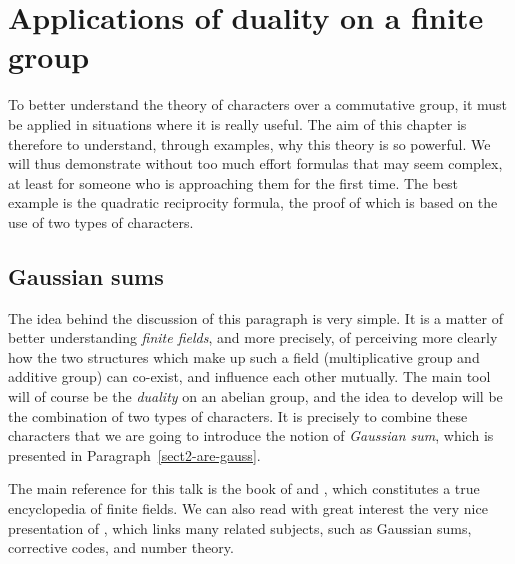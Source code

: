  
\chapter{Applications of duality on a finite group}
\label{chap-applications-trans-fourier-grpe-finite} 
 
To better understand the theory of characters over a commutative group, it must be applied in situations where it is really useful. The aim of this chapter is therefore to understand, through examples, why this theory is so powerful. We will thus demonstrate without too much effort formulas that may seem complex, at least for someone who is approaching them for the first time. The best example is the quadratic reciprocity formula, the proof of which is based on the use of two types of characters.

\section{Gaussian sums}
\label{sect1-are-gauss} 
 
 

 The idea behind the discussion of this paragraph is very simple. It is a matter of better understanding \textit{finite fields}, and more precisely, of perceiving more clearly how the two structures which make up such a field (multiplicative group and additive group) can co-exist, and influence each other mutually. The main tool will of course be the \textit{duality} on an abelian group, and the idea to develop will be the combination of two types of characters. It is precisely to combine these characters that we are going to introduce the notion of \textit{Gaussian sum}, which is presented in Paragraph~\ref{sect2-are-gauss}.
 
 
The main reference for this talk is the book of  and  \cite{lidl}, which constitutes a true encyclopedia of finite fields. We can also read with great interest the very nice presentation of  \cite{langevin}, which links many related subjects, such as Gaussian sums, corrective codes, and number theory.
